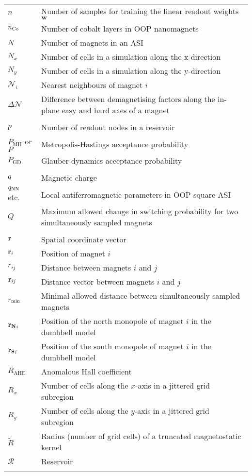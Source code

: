 \begin{longtable}[l]{p{60pt} p{350pt}}
	$n$ & Number of samples for training the linear readout weights $\boldsymbol{\mathbf{w}}$ \\
	$n_{\ce{Co}}$ & Number of cobalt layers in OOP nanomagnets \\
	$N$ & Number of magnets in an ASI \\
	$N_x$ & Number of cells in a simulation along the x-direction \\
	$N_y$ & Number of cells in a simulation along the y-direction \\
	$\mathcal{N}_i$ & Nearest neighbours of magnet $i$ \\
	$\Delta \mathcal{N}$ & Difference between demagnetising factors along the in-plane easy and hard axes of a magnet \\
	&\\

	$p$ & Number of readout nodes in a reservoir \\
	$P_\mathrm{MH}$ or $P$ & Metropolis-Hastings acceptance probability \\
	$P_\mathrm{GD}$ & Glauber dynamics acceptance probability \\
	&\\

	$q$ & Magnetic charge \\
	$q_\mathrm{NN}$ etc. & Local antiferromagnetic parameters in OOP square ASI \\
	$Q$ & Maximum allowed change in switching probability for two simultaneously sampled magnets \\
	&\\

	$\boldsymbol{\mathbf{r}}$ & Spatial coordinate vector \\
	$\boldsymbol{\mathbf{r}}_i$ & Position of magnet $i$ \\
	$r_{ij}$ & Distance between magnets $i$ and $j$ \\
	$\boldsymbol{\mathbf{r}}_{ij}$ & Distance vector between magnets $i$ and $j$ \\
	$r_\mathrm{min}$ & Minimal allowed distance between simultaneously sampled magnets \\
	$\boldsymbol{\mathbf{r_N}}_i$ & Position of the north monopole of magnet $i$ in the dumbbell model \\
	$\boldsymbol{\mathbf{r_S}}_i$ & Position of the south monopole of magnet $i$ in the dumbbell model \\
	$R_\mathrm{AHE}$ & Anomalous Hall coefficient \\
	$R_x$ & Number of cells along the $x$-axis in a jittered grid subregion \\
	$R_y$ & Number of cells along the $y$-axis in a jittered grid subregion \\
	$\widetilde{R}$ & Radius (number of grid cells) of a truncated magnetostatic kernel \\
	$\mathcal{R}$ & Reservoir \\
	&\\


\end{longtable}
